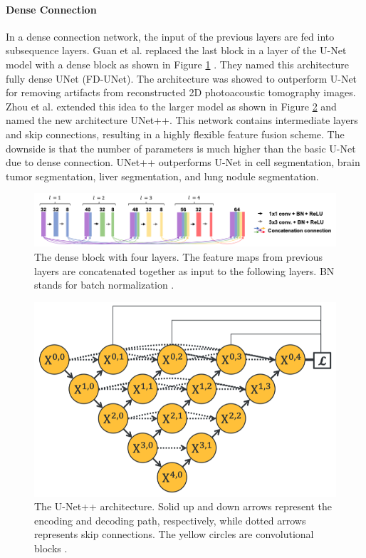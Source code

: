 \documentclass [11pt, proquest] {uwthesis}[2020/02/24]
\begin{document}
\paragraph{Dense Connection}

In a dense connection network, the input of the previous layers are fed into subsequence 
layers. Guan et al. replaced the last block in a layer of the U-Net model with a dense 
block as shown in Figure \ref{dense_connection} \cite{guan_fully_2020}. They named this 
architecture fully dense UNet (FD-UNet). The architecture was showed to outperform U-Net 
for removing artifacts from reconstructed 2D photoacoustic tomography images. Zhou et al. 
\cite{zhou_unet_2020} extended this idea to the larger model as shown in Figure \ref{unetpp} 
and named the new architecture UNet++. This network contains intermediate layers and skip connections, 
resulting in a highly flexible feature fusion scheme. The downside is that the number of parameters 
is much higher than the basic U-Net due to dense connection. UNet++ outperforms U-Net in 
cell segmentation, brain tumor segmentation, liver segmentation, and lung nodule segmentation.


\begin{figure}
  \centering
  \includegraphics[width=1\linewidth]{figures/dense_connection.png}
  \caption{The dense block with four layers. The feature maps from previous layers are concatenated together as input
  to the following layers. BN stands for batch normalization \cite{guan_fully_2020}.}
  \label{dense_connection}
\end{figure}


\begin{figure}
  \centering
  \includegraphics[width=0.6\linewidth]{figures/unet_pp.png}
  \caption{The U-Net++ architecture. Solid up and down arrows represent the encoding and decoding path,
  respectively, while dotted arrows represents skip connections. The yellow circles are
  convolutional blocks \cite{guan_fully_2020}.}
  \label{unetpp}
\end{figure}
\end{document}
